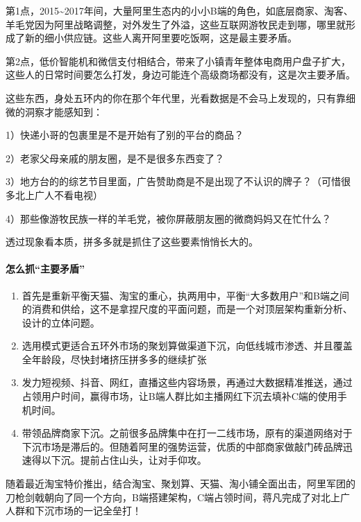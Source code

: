\documentclass[letterpaper,11pt,english]{sphinxmanual}
\begin{document}
第1点，2015\textasciitilde{}2017年间，大量阿里生态内的小小B端的角色，如底层商家、淘客、羊毛党因为阿里战略调整，对外发生了外溢，这些互联网游牧民走到哪，哪里就形成了新的细小供应链。这些人离开阿里要吃饭啊，这是最主要矛盾。

第2点，低价智能机和微信支付相结合，带来了小镇青年整体电商用户盘子扩大，这些人的日常时间要怎么打发，身边可能连个高级商场都没有，这是次主要矛盾。

这些东西，身处五环内的你在那个年代里，光看数据是不会马上发现的，只有靠细微的洞察才能感知到：

1）快递小哥的包裹里是不是开始有了别的平台的商品？

2）老家父母亲戚的朋友圈，是不是很多东西变了？

3）地方台的的综艺节目里面，广告赞助商是不是出现了不认识的牌子？（可惜很多北上广人不看电视）

4）那些像游牧民族一样的羊毛党，被你屏蔽朋友圈的微商妈妈又在忙什么？

透过现象看本质，拼多多就是抓住了这些要素悄悄长大的。


\paragraph{怎么抓“主要矛盾”}
\label{\detokenize{chapter_experience/taobao:id2}}\begin{enumerate}
%
\item {} 
首先是重新平衡天猫、淘宝的重心，执两用中，平衡“大多数用户”和B端之间的消费和供给，这不是拿捏尺度的平面问题，而是一个对顶层架构重新分析、设计的立体问题。

\item {} 
选用模式更适合五环外市场的聚划算做渠道下沉，向低线城市渗透、并且覆盖全年龄段，尽快封堵挤压拼多多的继续扩张

\item {} 
发力短视频、抖音、网红，直播这些内容场景，再通过大数据精准推送，通过占领用户时间，赢得市场，让B端人群比如主播网红下沉去填补C端的使用手机时间。

\item {} 
带领品牌商家下沉。之前很多品牌集中在打一二线市场，原有的渠道网络对于下沉市场是滞后的。但随着阿里的强势运营，优质的中部商家做敲门砖品牌迅速得以下沉。提前占住山头，让对手仰攻。

\end{enumerate}

随着最近淘宝特价推出，结合淘宝、聚划算、天猫、淘小铺全面出击，阿里军团的刀枪剑戟朝向了同一个方向，B端搭建架构，C端占领时间，蒋凡完成了对北上广人群和下沉市场的一记全垒打！
\end{document}
